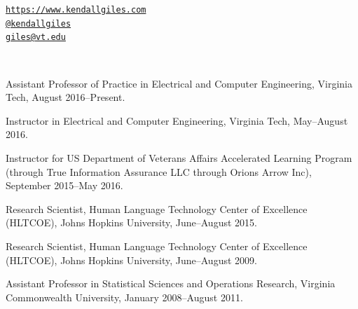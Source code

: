 \documentclass[11pt,article,oneside]{memoir}
\makeatletter
\def\myemail{giles@vt.edu}
\def\myweb{https://www.kendallgiles.com}
\def\mytwitter{@kendallgiles}
\makeatother
\begin{document}
\begin{minipage}[t]{0.595\textwidth}
\end{minipage}
\begin{minipage}[t]{0.400\textwidth}
  \flushright \footnotesize  
  {\normalsize  \texttt{\href{\myweb}{\myweb}} \, \faGlobe} \\
  {\normalsize  \texttt{\href{https://twitter.com/kendallgiles}{\mytwitter}} \, \faTwitter }  \\ 
  {\normalsize  \texttt{\href{mailto:\myemail}{\myemail}} \, \faEnvelope} \\
\end{minipage}

\medskip
 \\
\reversemarginpar
\noindent{\scheader \monthyeardate\today}

\bigskip       


{}

\ind Assistant Professor of Practice in Electrical and Computer Engineering, Virginia Tech, August 2016--Present.      

\ind Instructor in Electrical and Computer Engineering, Virginia Tech, May--August 2016. 

\ind Instructor for US Department of Veterans Affairs Accelerated Learning Program (through True Information Assurance LLC through Orions Arrow Inc), September 2015--May 2016.

\ind Research Scientist, Human Language Technology Center of Excellence (HLTCOE), Johns Hopkins University,  June--August 2015.

\ind Research Scientist, Human Language Technology Center of Excellence (HLTCOE), Johns Hopkins University,  June--August 2009.

\ind Assistant Professor in Statistical Sciences and Operations Research, Virginia Commonwealth University, January 2008--August 2011.
\end{document}
